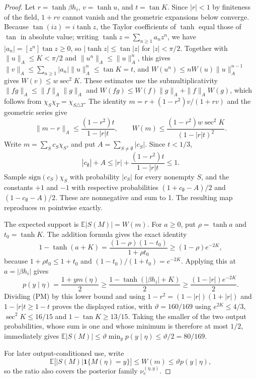 \documentclass[11pt]{article}
\theoremstyle{definition}\newtheorem{definition}[theorem]{Definition}
\theoremstyle{remark}\newtheorem{remark}[theorem]{Remark}
\newcommand{\E}{\mathbb E}\newcommand{\Prb}{\mathbb P}
\begin{document}
\begin{proof}
Let \(r=\tanh\beta h_i\), \(v=\tanh u\), and \(t=\tan K\). Since \(|r|<1\) by finiteness of the field, \(1+rv\) cannot vanish and the geometric expansions below converge. Because \(\tan(iz)=i\tanh z\), the Taylor coefficients of \(\tanh\) equal those of \(\tan\) in absolute value; writing \(\tanh z=\sum_{n\ge1}a_nz^n\), we have \(|a_n|=[z^n]\tan z\ge0\), so \(|\tanh z|\le\tan|z|\) for \(|z|<\pi/2\). Together with \(\|u\|_A\le K<\pi/2\) and \(\|u^n\|_A\le\|u\|_A^n\), this gives \(\|v\|_A\le\sum_{n\ge1}|a_n|\|u\|_A^n\le\tan K=t\), and \(W(u^n)\le nW(u)\|u\|_A^{n-1}\) gives \(W(v)\le w\sec^2K\). These estimates use the submultiplicativity \(\|fg\|_A\le\|f\|_A\|g\|_A\) and \(W(fg)\le W(f)\|g\|_A+\|f\|_AW(g)\), which follows from \(\chi_S\chi_T=\chi_{S\triangle T}\). The identity \(m=r+(1-r^2)v/(1+rv)\) and the geometric series give
\[
 \|m-r\|_A\le\frac{(1-r^2)t}{1-|r|t},\qquad
 W(m)\le\frac{(1-r^2)w\sec^2K}{(1-|r|t)^2}.
 \tag{PM}
\]
Write \(m=\sum_Sc_S\chi_S\), and put \(A=\sum_{S\ne\emptyset}|c_S|\). Since \(t<1/3\),
\[
 |c_\emptyset|+A\le|r|+\frac{(1-r^2)t}{1-|r|t}\le1.
\]
Sample \(\mathrm{sign}(c_S)\chi_S\) with probability \(|c_S|\) for every nonempty \(S\), and the constants \(+1\) and \(-1\) with respective probabilities \((1+c_\emptyset-A)/2\) and \((1-c_\emptyset-A)/2\). These are nonnegative and sum to 1. The resulting map reproduces \(m\) pointwise exactly.

The expected support is \(\E|S(M)|=W(m)\). For \(a\ge0\), put \(\rho=\tanh a\) and \(t_0=\tanh K\). The addition formula gives the exact identity
\[
 1-\tanh(a+K)=\frac{(1-\rho)(1-t_0)}{1+\rho t_0}\ge(1-\rho)e^{-2K},
\]
because \(1+\rho t_0\le1+t_0\) and \((1-t_0)/(1+t_0)=e^{-2K}\). Applying this at \(a=|\beta h_i|\) gives
\[
 p(y\mid\eta)=\frac{1+ym(\eta)}2\ge\frac{1-\tanh(|\beta h_i|+K)}2\ge\frac{(1-|r|)e^{-2K}}2.
\]
Dividing (PM) by this lower bound and using \(1-r^2=(1-|r|)(1+|r|)\) and \(1-|r|t\ge1-t\) proves the displayed ratios, with \(\vartheta=160/169\) using \(e^{2K}\le4/3\), \(\sec^2K\le16/15\) and \(1-\tan K\ge13/15\). Taking the smaller of the two output probabilities, whose sum is one and whose minimum is therefore at most \(1/2\), immediately gives \(\E|S(M)|\le\vartheta\min_yp(y\mid\eta)\le\vartheta/2=80/169\).

For later output-conditioned use, write
\[
 \E\bigl[|S(M)|\mathbf 1\{M(\eta)=y\}\bigr]\le W(m)\le\vartheta p(y\mid\eta),
\]
so the ratio also covers the posterior family \(\nu_e^{(\eta,y)}\).
\end{proof}
\end{document}
